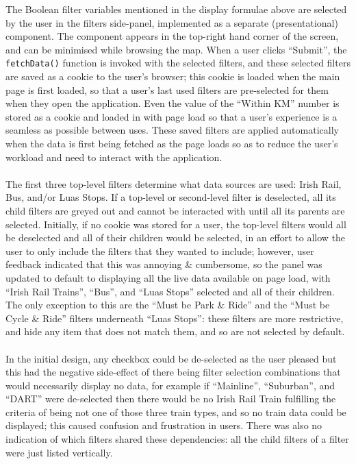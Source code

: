 \documentclass[a4paper,11pt]{report}
\begin{document}
The Boolean filter variables mentioned in the display formulae above are selected by the user in the filters side-panel, implemented as a separate (presentational) component.
The component appears in the top-right hand corner of the screen, and can be minimised while browsing the map.
When a user clicks ``Submit'', the \texttt{fetchData()} function is invoked with the selected filters, and these selected filters are saved as a cookie to the user's browser; 
this cookie is loaded when the main page is first loaded, so that a user's last used filters are pre-selected for them when they open the application.
Even the value of the ``Within KM'' number is stored as a cookie and loaded in with page load so that a user's experience is a seamless as possible between uses.
These saved filters are applied automatically when the data is first being fetched as the page loads so as to reduce the user's workload and need to interact with the application.
\\\\
The first three top-level filters determine what data sources are used: Irish Rail, Bus, and/or Luas Stops.
If a top-level or second-level filter is deselected, all its child filters are greyed out and cannot be interacted with until all its parents are selected. 
Initially, if no cookie was stored for a user, the top-level filters would all be deselected and all of their children would be selected, in an effort to allow the user to only include the filters that they wanted to include;
however, user feedback indicated that this was annoying \& cumbersome, so the panel was updated to default to displaying all the live data available on page load, 
with ``Irish Rail Trains'', ``Bus'', and ``Luas Stops'' selected and all of their children.
The only exception to this are the ``Must be Park \& Ride'' and the ``Must be Cycle \& Ride'' filters underneath ``Luas Stops'': these filters are more restrictive, and hide any item that does not match them, and so are not selected by default.
\\\\
In the initial design, any checkbox could be de-selected as the user pleased but this had the negative side-effect of there being filter selection combinations that would necessarily display no data, for example if ``Mainline'', ``Suburban'', and ``DART'' were de-selected then there would be no Irish Rail Train fulfilling the criteria of being not one of those three train types, and so no train data could be displayed;
this caused confusion and frustration in users.
There was also no indication of which filters shared these dependencies: all the child filters of a filter were just listed vertically.
\end{document}
